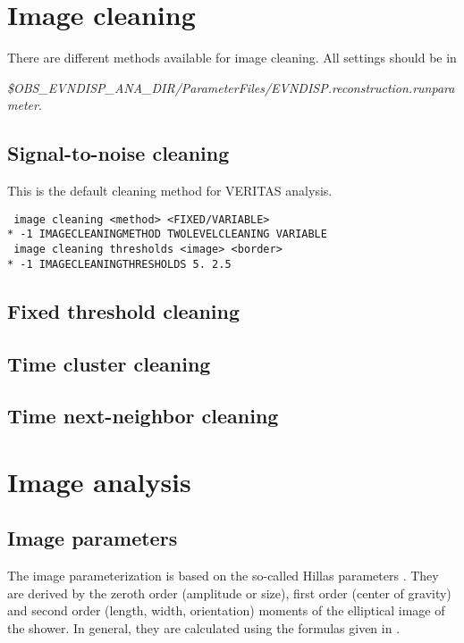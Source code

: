 \documentclass[titlepage,a4paper,twoside,11pt]{report}
\begin{document}
\section{Image cleaning}

There are different methods available for image cleaning.  All settings should be in

{\it \$OBS\_EVNDISP\_ANA\_DIR/ParameterFiles/EVNDISP.reconstruction.runparameter}.

\subsection{Signal-to-noise cleaning}

This is the default cleaning method for VERITAS analysis.

\begin{lstlisting}
 image cleaning <method> <FIXED/VARIABLE>
* -1 IMAGECLEANINGMETHOD TWOLEVELCLEANING VARIABLE
 image cleaning thresholds <image> <border>
* -1 IMAGECLEANINGTHRESHOLDS 5. 2.5
\end{lstlisting}


\subsection{Fixed threshold cleaning}

\subsection{Time cluster cleaning}

\subsection{Time next-neighbor cleaning}

\section{Image analysis}

\subsection{Image parameters}
The image parameterization is based on the so-called Hillas parameters \cite{1985ICRC....3..445H}. They are derived by the zeroth order (amplitude or size), first order (center of gravity) and second order (length, width, orientation) moments of the elliptical image of the shower. In general, they are calculated using the formulas given in \cite{1997JPhG...23.1013F}.
\end{document}
